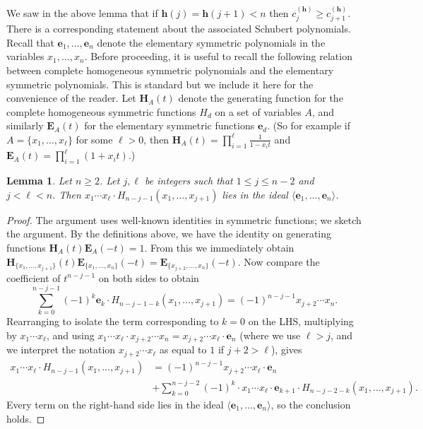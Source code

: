 \documentclass[11pt]{amsart}
\theoremstyle{plain}
\newtheorem{lem}[thm]{Lemma}
\theoremstyle{definition}
\newcommand{\hess}{{\mathbf h}}
\numberwithin{equation}{section}
\begin{document}
We saw in the above lemma that if $\hess(j)=\hess(j+1)<n$ then $c_j^{(\hess)} \geq c_{j+1}^{(\hess)}$. There is a corresponding statement about the associated Schubert polynomials. Recall that $\mathbf{e}_1,\ldots,\mathbf{e}_n$ denote the elementary symmetric polynomials in the variables $x_1,\ldots,x_n$. Before proceeding, it is useful to recall the following relation between complete homogeneous symmetric polynomials and the elementary symmetric polynomials.  This is standard but we include it here for the convenience of the reader. Let $\mathbf{H}_A(t)$ denote the generating function for the complete homogeneous symmetric functions $H_d$ on a set of variables $A$, and similarly $\mathbf{E}_A(t)$ for the elementary symmetric functions $\mathbf{e}_d$. 
(So for example if $A = \{x_1,\ldots,x_\ell\}$ for some $\ell>0$,
then $\mathbf{H}_A(t) = \prod_{i=1}^\ell \frac{1}{1-x_i t}$ and $\mathbf{E}_A(t) = \prod_{i=1}^{\ell}(1+x_it)$.) 

\begin{lem}\label{lemma: lies in ideal}
Let $n \geq 2$. Let $j, \ell$ be integers such that $1 \leq j \leq n-2$ and $j<\ell<n$. Then $x_1 \cdots x_\ell \cdot H_{n-j-1}(x_1,\ldots,x_{j+1})$ lies in the ideal $\langle \mathbf{e}_1,\ldots,\mathbf{e}_n\rangle$.
\end{lem}

\begin{proof} 
The argument uses well-known identities in symmetric functions; we sketch the argument. By the definitions above, we have the identity on generating functions $\mathbf{H}_A(t)\mathbf{E}_A(-t)=1$. From this we immediately obtain $\mathbf{H}_{\{x_1,\ldots,x_{j+1}\}}(t)\mathbf{E}_{\{x_1,\ldots,x_n\}}(-t) = \mathbf{E}_{\{x_{j+2},\ldots,x_n\}}(-t)$. Now compare the coefficient of $t^{n-j-1}$ on both sides to obtain 
\[
\sum_{k=0}^{n-j-1}(-1)^k \mathbf{e}_k \cdot
H_{n-j-1-k}(x_1,\ldots,x_{j+1})
=(-1)^{n-j-1} x_{j+2}\cdots x_n.
\]
Rearranging to isolate the term corresponding to $k=0$ on the LHS, multiplying by $x_1\cdots x_\ell$, and using $x_1\cdots x_\ell \cdot x_{j+2}\cdots x_n=x_{j+2}\cdots x_\ell \cdot \mathbf{e}_n$ (where we use $\ell>j$, and we interpret the notation $x_{j+2}\cdots x_\ell$ as equal to $1$ if $j+2>\ell$), gives
\begin{equation*}
    \begin{split}
x_1 \cdots x_\ell \cdot H_{n-j-1}(x_1,\ldots,x_{j+1}) &= (-1)^{n-j-1} x_{j+2}\cdots x_\ell \cdot \mathbf{e}_n \\
& + \sum_{k=0}^{n-j-2} (-1)^k \cdot x_1\cdots x_\ell \cdot \mathbf{e}_{k+1} \cdot H_{n-j-2-k}(x_1,\ldots,x_{j+1}).
\end{split}
\end{equation*}
Every term on the right-hand side lies in 
the ideal $\langle \mathbf{e}_1,\ldots,\mathbf{e}_n\rangle$, so the conclusion
holds.
\end{proof} 
\end{document}
